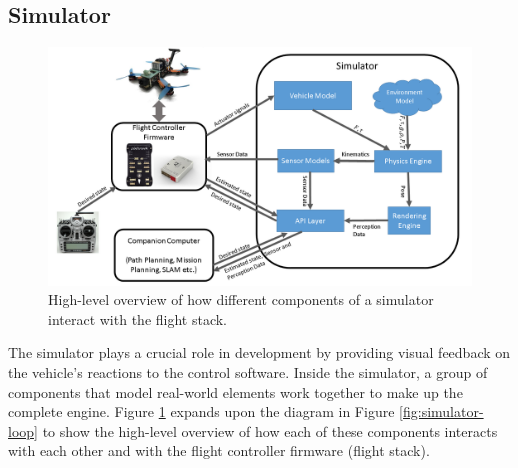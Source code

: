 \subsection{Simulator}


\begin{figure}
  \centering
  \includegraphics[width=\textwidth,keepaspectratio]{img/airsim-overview.png}
  \caption{High-level overview of how different components of a simulator interact with the flight stack.}
  \label{fig:airsim-overview}
\end{figure}

The simulator plays a crucial role in development by providing visual feedback on the vehicle’s reactions to the control software.
Inside the simulator, a group of components that model real-world elements work together to make up the complete engine.
Figure \ref{fig:airsim-overview} expands upon the diagram in Figure \ref{fig:simulator-loop} to show the high-level overview of how each of these components interacts with each other and with the flight controller firmware (flight stack).

